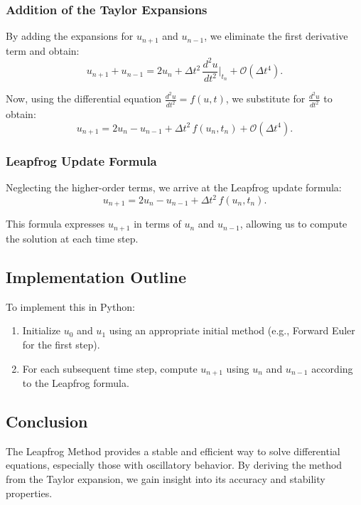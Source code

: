 \documentclass{article}
\begin{document}
\subsubsection{Addition of the Taylor Expansions}
By adding the expansions for $u_{n+1}$ and $u_{n-1}$, we eliminate the first derivative term and obtain:
\begin{equation}
    u_{n+1} + u_{n-1} = 2 u_n + \Delta t^2 \, \frac{d^2 u}{dt^2}\Big|_{t_n} + \mathcal{O}(\Delta t^4).
\end{equation}

Now, using the differential equation $\frac{d^2 u}{dt^2} = f(u, t)$, we substitute for $\frac{d^2 u}{dt^2}$ to obtain:
\begin{equation}
    u_{n+1} = 2 u_n - u_{n-1} + \Delta t^2 \, f(u_n, t_n) + \mathcal{O}(\Delta t^4).
\end{equation}

\subsubsection{Leapfrog Update Formula}
Neglecting the higher-order terms, we arrive at the Leapfrog update formula:
\begin{equation}
    u_{n+1} = 2 u_n - u_{n-1} + \Delta t^2 \, f(u_n, t_n).
\end{equation}

This formula expresses $u_{n+1}$ in terms of $u_n$ and $u_{n-1}$, allowing us to compute the solution at each time step.

\subsection{Implementation Outline}
To implement this in Python:
\begin{enumerate}
    \item Initialize $u_0$ and $u_1$ using an appropriate initial method (e.g., Forward Euler for the first step).
    \item For each subsequent time step, compute $u_{n+1}$ using $u_n$ and $u_{n-1}$ according to the Leapfrog formula.
\end{enumerate}

\subsection{Conclusion}
The Leapfrog Method provides a stable and efficient way to solve differential equations, especially those with oscillatory behavior. By deriving the method from the Taylor expansion, we gain insight into its accuracy and stability properties.
\end{document}
